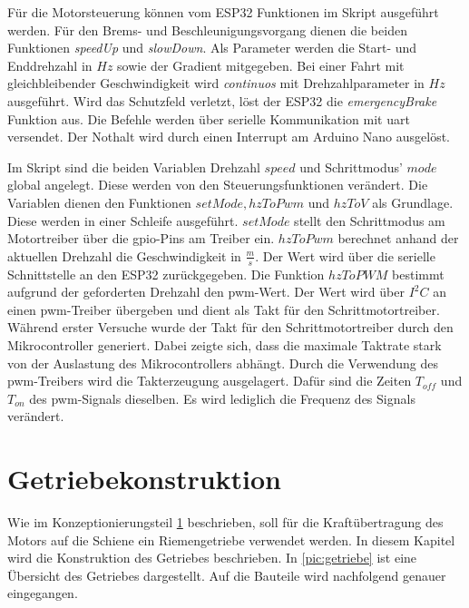Für die Motorsteuerung können vom ESP32 Funktionen im Skript ausgeführt werden. Für den Brems- und Beschleunigungsvorgang dienen die beiden Funktionen \textit{ speedUp} und \textit{slowDown}. Als Parameter werden die Start- und Enddrehzahl in $Hz$ sowie der Gradient mitgegeben. Bei einer Fahrt mit gleichbleibender Geschwindigkeit wird \textit{continuos} mit Drehzahlparameter in $Hz$ ausgeführt. Wird das Schutzfeld verletzt, löst der ESP32 die \textit{emergencyBrake} Funktion aus. Die Befehle werden über serielle Kommunikation mit \acrshort{uart} versendet. Der Nothalt wird durch einen Interrupt am Arduino Nano ausgelöst. \\
\newpage

Im Skript sind die beiden Variablen Drehzahl $speed$ und Schrittmodus' $mode$ global angelegt. Diese werden von den Steuerungsfunktionen verändert. Die Variablen dienen den Funktionen $setMode, hzToPwm$ und $hzToV$ als Grundlage. Diese werden in einer Schleife ausgeführt. $setMode$ stellt den Schrittmodus am Motortreiber über die \acrshort{gpio}-Pins am  Treiber ein. $hzToPwm$ berechnet anhand der aktuellen Drehzahl die Geschwindigkeit in $\frac{m}{s}$. Der Wert wird über die serielle Schnittstelle an den ESP32 zurückgegeben. Die Funktion $hzToPWM$ bestimmt aufgrund der geforderten Drehzahl den \acrshort{pwm}-Wert. Der Wert wird über $I^2C$ an einen  \acrshort{pwm}-Treiber übergeben und dient als Takt für den Schrittmotortreiber. \\

Während erster Versuche wurde der Takt für den Schrittmotortreiber durch den Mikrocontroller generiert. Dabei zeigte sich, dass die maximale Taktrate stark von der Auslastung des Mikrocontrollers abhängt. Durch die Verwendung des \acrshort{pwm}-Treibers wird die Takterzeugung ausgelagert. Dafür sind die Zeiten $T_{off}$ und $T_{on}$ des \acrshort{pwm}-Signals dieselben. Es wird lediglich die Frequenz des Signals verändert. 
 \newpage

\section{Getriebekonstruktion}
\label{sec:getriebekonstruktion}
Wie im Konzeptionierungsteil \ref{sec:getriebekonstruktion} beschrieben, soll für die Kraftübertragung des Motors auf die Schiene ein Riemengetriebe verwendet werden. In diesem Kapitel wird die Konstruktion des Getriebes beschrieben. In \autoref{pic:getriebe} ist eine Übersicht des Getriebes dargestellt. Auf die Bauteile wird nachfolgend genauer eingegangen. 

